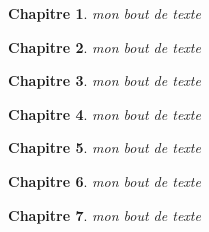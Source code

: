 \documentclass[12pt,a4paper]{article}
\newtheorem{chap}{Chapitre}
\begin{document}
\begin{chap}
{\selectfont mon bout de texte}

\end{chap}
\begin{chap}
{\selectfont mon bout de texte}

\end{chap}
\begin{chap}
{\selectfont mon bout de texte}

\end{chap}
\begin{chap}
{\selectfont mon bout de texte}

\end{chap}
\begin{chap}
{\selectfont mon bout de texte}

\end{chap}
\begin{chap}
{\selectfont mon bout de texte}

\end{chap}
\begin{chap}
{\selectfont mon bout de texte}

\end{chap}
\\ \newpage
\end{document}

